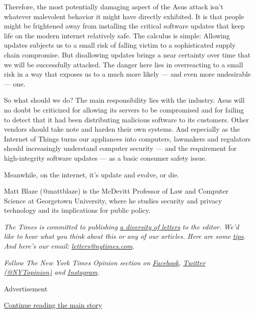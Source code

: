 Therefore, the most potentially damaging aspect of the Asus attack isn't
whatever malevolent behavior it might have directly exhibited. It is
that people might be frightened away from installing the critical
software updates that keep life on the modern internet relatively safe.
The calculus is simple: Allowing updates subjects us to a small risk of
falling victim to a sophisticated supply chain compromise. But
disallowing updates brings a near certainty over time that we will be
successfully attacked. The danger here lies in overreacting to a small
risk in a way that exposes us to a much more likely --- and even more
undesirable --- one.

So what should we do? The main responsibility lies with the industry.
Asus will no doubt be criticized for allowing its servers to be
compromised and for failing to detect that it had been distributing
malicious software to its customers. Other vendors should take note and
harden their own systems. And especially as the Internet of Things turns
our appliances into computers, lawmakers and regulators should
increasingly understand computer security --- and the requirement for
high-integrity software updates --- as a basic consumer safety issue.

Meanwhile, on the internet, it's update and evolve, or die.

Matt Blaze (@mattblaze) is the McDevitt Professor of Law and Computer
Science at Georgetown University, where he studies security and privacy
technology and its implications for public policy.

\emph{The Times is committed to publishing}
\href{https://www.nytimes.com/2019/01/31/opinion/letters/letters-to-editor-new-york-times-women.html}{\emph{a
diversity of letters}} \emph{to the editor. We'd like to hear what you
think about this or any of our articles. Here are some}
\href{https://help.nytimes.com/hc/en-us/articles/115014925288-How-to-submit-a-letter-to-the-editor}{\emph{tips}}\emph{.
And here's our email:}
\href{mailto:letters@nytimes.com}{\emph{letters@nytimes.com}}\emph{.}

\emph{Follow The New York Times Opinion section on}
\href{https://www.facebook.com/nytopinion}{\emph{Facebook}}\emph{,}
\href{http://twitter.com/NYTOpinion}{\emph{Twitter (@NYTopinion)}}
\emph{and}
\href{https://www.instagram.com/nytopinion/}{\emph{Instagram}}\emph{.}

Advertisement

\protect\hyperlink{after-bottom}{Continue reading the main story}

